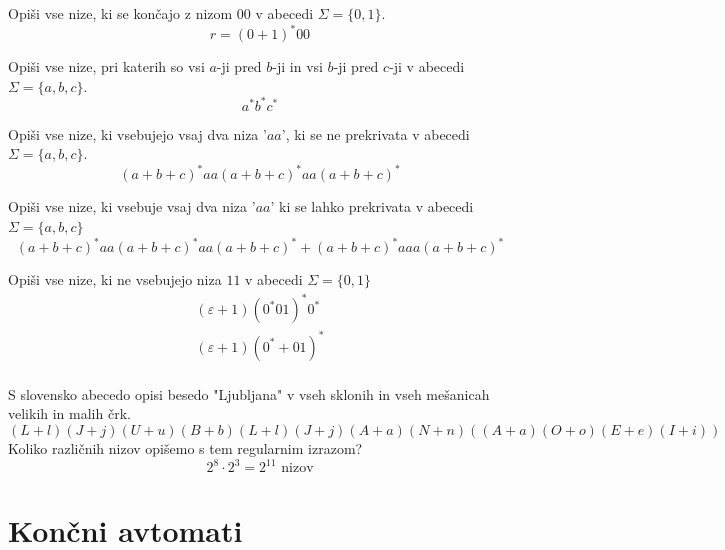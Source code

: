 \documentclass[10pt,a4paper,oneside]{book}
\begin{document}
\begin{primeri}
\item Opiši vse nize, ki se končajo z nizom $00$ v abecedi $\Sigma = \{ 0,1 \}$.
	\begin{displaymath}
	r = (0+1)^*00
	\end{displaymath}
	\item Opiši vse nize, pri katerih so vsi $a$-ji pred $b$-ji in vsi $b$-ji pred $c$-ji v abecedi $\Sigma = \lbrace a,b,c \rbrace$.
		\begin{displaymath}
		a^*b^*c^*
		\end{displaymath}
	\item Opiši vse nize, ki vsebujejo vsaj dva niza '$aa$', ki se ne prekrivata v abecedi $\Sigma = \lbrace a,b,c \rbrace$.
		\begin{displaymath}
		(a+b+c)^* aa (a+b+c)^* aa (a+b+c)^* 
		\end{displaymath}
	\item Opiši vse nize, ki vsebuje vsaj dva niza '$aa$' ki se lahko prekrivata v abecedi $\Sigma = \lbrace a,b,c \rbrace$
		\begin{displaymath}
		(a+b+c)^* aa (a+b+c)^* aa (a+b+c)^* + (a+b+c)^* aaa (a+b+c)^* 
		\end{displaymath}
	\item Opiši vse nize, ki ne vsebujejo niza $11$ v abecedi $\Sigma = \lbrace 0,1 \rbrace$\\
		\begin{align*} 
		(\varepsilon  + 1 )(0^*01)^* 0^* \\
		(\varepsilon  + 1 )(0^* + 01)^* \\
		\end{align*} 
	\item S slovensko abecedo opisi besedo "Ljubljana" v vseh sklonih in vseh mešanicah velikih in malih črk.
		\begin{displaymath}
		(L+l) (J+j) (U+u) (B+b) (L+l) (J+j) (A+a) (N+n) \left( (A+a)(O+o)(E+e)(I+i) \right) 
		\end{displaymath}
		Koliko različnih nizov opišemo s tem regularnim izrazom?\\
		\begin{displaymath}
		2^8 \cdot 2^3 = 2^{11} \mbox{ nizov}
		\end{displaymath}
\end{primeri}

\section{Končni avtomati}
\end{document}
